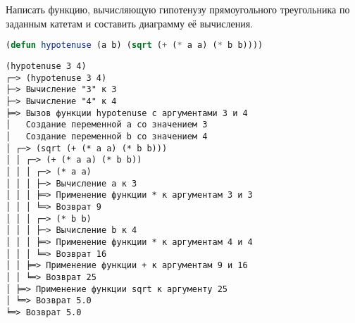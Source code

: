 Написать функцию, вычисляющую гипотенузу прямоугольного треугольника по
заданным катетам и составить диаграмму её вычисления.

\begin{lstlisting}[language=Lisp]
(defun hypotenuse (a b) (sqrt (+ (* a a) (* b b))))
\end{lstlisting}

\begin{verbatim}
(hypotenuse 3 4)
┌─> (hypotenuse 3 4)
├─> Вычисление "3" к 3
├─> Вычисление "4" к 4
╞═> Вызов функции hypotenuse с аргументами 3 и 4
│   Создание переменной a со значением 3
│   Создание переменной b со значением 4
│ ┌─> (sqrt (+ (* a a) (* b b)))
│ │ ┌─> (+ (* a a) (* b b))
│ │ │ ┌─> (* a a)
│ │ │ ├─> Вычисление a к 3
│ │ │ ╞═> Применение функции * к аргументам 3 и 3
│ │ │ ╘═> Возврат 9
│ │ │ ┌─> (* b b)
│ │ │ ├─> Вычисление b к 4
│ │ │ ╞═> Применение функции * к аргументам 4 и 4
│ │ │ ╘═> Возврат 16
│ │ ╞═> Применение функции + к аргументам 9 и 16
│ │ ╘═> Возврат 25
│ ╞═> Применение функции sqrt к аргументу 25
│ ╘═> Возврат 5.0
╘═> Возврат 5.0
\end{verbatim}

